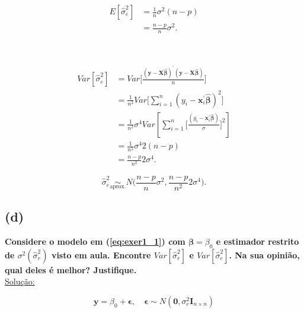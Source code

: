 \documentclass[12pt, oldfontcommands]{article}\usepackage[]{graphicx}\usepackage[]{color}
\begin{document}
\begin{multicols}{2}
\begin{align*}
 E[\hat{\sigma}_{e}^{2}] & = \frac{1}{n} \sigma^{2} (n - p) \\
                         & = \frac{n - p}{n} \sigma^{2}.
\\ \\ \\ \\ \\ \\ \\ \\
\end{align*}
\begin{align*}
 Var[\hat{\sigma}_{e}^{2}] & =
 Var\bigg[\frac{(\mathbf{y} - \mathbf{X} \hat{\bm{\beta}})^{'}
                (\mathbf{y} - \mathbf{X} \hat{\bm{\beta}})}{n}\bigg] \\
 & = \frac{1}{n^{2}} Var\bigg[
     \sum_{i = 1}^{n} (y_{i} - \bm{x}_{i}^{'}\hat{\bm{\beta}})^{2}\bigg]
 \\ & = \frac{1}{n^{2}} \sigma^{4} Var\left[\sum_{i = 1}^{n}
 \Bigg[\frac{(y_{i} - \bm{x}_{i}^{'}\hat{\bm{\beta}})}{\sigma}\Bigg]^{2}
 \right] \\ & = \frac{1}{n^{2}} \sigma^{4} 2 (n - p) \\
 & = \frac{n - p}{n^{2}} 2 \sigma^{4}.
\end{align*}
\end{multicols}

\[ \boxed{\hat{\sigma}_{e}^{2} \underset{\text{aprox.}}{\sim}
          N\bigg(\frac{n - p}{n} \sigma^{2},
                \frac{n - p}{n^{2}} 2 \sigma^{4}\bigg).} \]

\subsection*{(d)} 

\textbf{Considere o modelo em (\ref{eq:exer1_1}) com
        \(\bm{\beta} = \beta_{0}\) e estimador restrito de
        \(\sigma^{2} (\hat{\sigma}_{r}^{2})\) visto em aula. Encontre
        \(Var[\hat{\sigma}_{r}^{2}]\) e \(Var[\hat{\sigma}_{e}^{2}]\).
        Na sua opinião, qual deles é melhor? Justifique.} \\

\underline{Solução:}

\[ \mathbf{y} = \beta_{0} + \bm{\epsilon}, \quad
   \bm{\epsilon} \sim
   N(\mathbf{0}, \sigma_{e}^{2}\mathbf{I}_{n \times n}) \]
\end{document}
